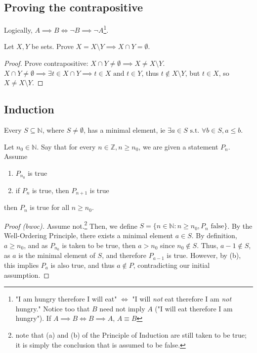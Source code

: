 \documentclass[12pt,oneside]{article}
\begin{document}

\subsection{Proving the contrapositive}
Logically, $A \implies B \iff \neg B \implies \neg A$\footnote{"I am hungry therefore I will eat" $\iff$ "I will \textit{not} eat therefore I am \textit{not} hungry." Notice too that $B$ need not imply $A$ ("I will eat therefore I am hungry"). If $A \implies B \iff B \implies A$, $A \equiv B$}.

\begin{example}
  Let $X,Y$ be sets. Prove $X = X\setminus Y \implies X \cap Y = \emptyset$.
  \begin{proof}
    Prove contrapositive: $X \cap Y \neq \emptyset \implies X \neq X \setminus Y$. $X \cap Y \neq \emptyset \implies \exists t \in X \cap Y \implies t \in X \text{ and } t \in Y$, thus $t \notin X\setminus Y$, but $t \in X$, so $X \neq X \setminus Y$.
  \end{proof}
\end{example}

\subsection{Induction}

\begin{axiom}
  Every $S \subseteq \mathbb{N}$, where $S \neq \emptyset$, has a minimal element, ie $\exists a \in S \text{ s.t. } \forall b \in S, a \leq b$.
\end{axiom}

\begin{theorem}
  Let $n_0 \in \mathbb{N}$. Say that for every $n \in \mathbb{Z}, n \geq n_0$, we are given a statement $P_n$. Assume
  \begin{enumerate}[label=(\alph*)]
    \item $P_{n_0}$ is true
    \item if $P_n$ is true, then $P_{n+1}$ is true
  \end{enumerate}
  then $P_n$ is true for all $n \geq n_0$.
\end{theorem}

\begin{proof}[Proof (bwoc)]
 Assume not.\footnote{note that (a) and (b) of the Principle of Induction are still taken to be true; it is simply the conclusion that is assumed to be false. } Then, we define $S = \{n \in \mathbb{N} : n \geq n_0, P_n \text{ false}\}$. By the Well-Ordering Principle, there exists a minimal element $a \in S$. By definition, $a \geq n_0$, and as $P_{n_0}$ is taken to be true, then $a > n_0$ since $n_0 \notin S$. Thus, $a-1 \notin S$, as $a$ is the minimal element of $S$, and therefore $P_{a-1}$ is true. However, by (b), this implies $P_{a}$ is also true, and thus $a \notin P$, contradicting our initial assumption.
\end{proof}
\end{document}
